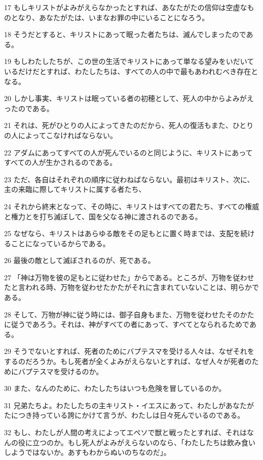 \par 17 もしキリストがよみがえらなかったとすれば、あなたがたの信仰は空虚なものとなり、あなたがたは、いまなお罪の中にいることになろう。
\par 18 そうだとすると、キリストにあって眠った者たちは、滅んでしまったのである。
\par 19 もしわたしたちが、この世の生活でキリストにあって単なる望みをいだいているだけだとすれば、わたしたちは、すべての人の中で最もあわれむべき存在となる。
\par 20 しかし事実、キリストは眠っている者の初穂として、死人の中からよみがえったのである。
\par 21 それは、死がひとりの人によってきたのだから、死人の復活もまた、ひとりの人によってこなければならない。
\par 22 アダムにあってすべての人が死んでいるのと同じように、キリストにあってすべての人が生かされるのである。
\par 23 ただ、各自はそれぞれの順序に従わねばならない。最初はキリスト、次に、主の来臨に際してキリストに属する者たち、
\par 24 それから終末となって、その時に、キリストはすべての君たち、すべての権威と権力とを打ち滅ぼして、国を父なる神に渡されるのである。
\par 25 なぜなら、キリストはあらゆる敵をその足もとに置く時までは、支配を続けることになっているからである。
\par 26 最後の敵として滅ぼされるのが、死である。
\par 27 「神は万物を彼の足もとに従わせた」からである。ところが、万物を従わせたと言われる時、万物を従わせたかたがそれに含まれていないことは、明らかである。
\par 28 そして、万物が神に従う時には、御子自身もまた、万物を従わせたそのかたに従うであろう。それは、神がすべての者にあって、すべてとなられるためである。
\par 29 そうでないとすれば、死者のためにバプテスマを受ける人々は、なぜそれをするのだろうか。もし死者が全くよみがえらないとすれば、なぜ人々が死者のためにバプテスマを受けるのか。
\par 30 また、なんのために、わたしたちはいつも危険を冒しているのか。
\par 31 兄弟たちよ。わたしたちの主キリスト・イエスにあって、わたしがあなたがたにつき持っている誇にかけて言うが、わたしは日々死んでいるのである。
\par 32 もし、わたしが人間の考えによってエペソで獣と戦ったとすれば、それはなんの役に立つのか。もし死人がよみがえらないのなら、「わたしたちは飲み食いしようではないか。あすもわからぬいのちなのだ」。
